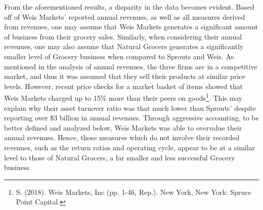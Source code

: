 \documentclass[12pt]{article}
\begin{document}
\begin{doublespacing}
From the aforementioned results, a disparity in the data becomes evident. Based off of Weis Markets’ reported annual revenues, as well as all measures derived from revenues, one may assume that Weis Markets generates a significant amount of business from their grocery sales. Similarly, when considering their annual revenues, one may also assume that Natural Grocers generates a significantly smaller level of Grocery business when compared to Sprouts and Weis. As mentioned in the analysis of annual revenues, the three firms are in a competitive market, and thus it was assumed that they sell their products at similar price levels. However, recent price checks for a market basket of items showed that Weis Markets charged up to 15\% more than their peers on goods\footnote{S. (2018). Weis Markets, Inc (pp. 1-46, Rep.). New York, New York: Spruce Point Capital.}. This may explain why their asset turnover ratio was that much lower than Sprouts’ despite reporting over \$3 billion in annual revenues. Through aggressive accounting, to be better defined and analyzed below, Weis Markets was able to overvalue their annual revenues. Hence, those measures which do not involve their recorded revenues, such as the return ratios and operating cycle, appear to be at a similar level to those of Natural Grocers, a far smaller and less successful Grocery business. 
\\


\end{doublespacing}
\end{document}
